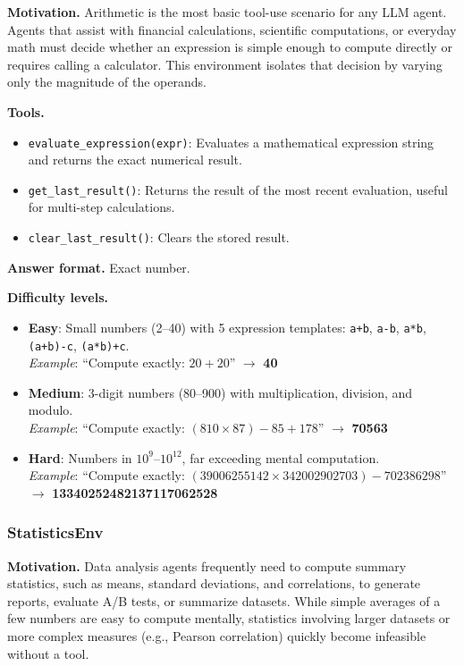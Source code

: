 \textbf{Motivation.}
Arithmetic is the most basic tool-use scenario for any LLM agent. Agents that assist with financial calculations, scientific computations, or everyday math must decide whether an expression is simple enough to compute directly or requires calling a calculator. This environment isolates that decision by varying only the magnitude of the operands.

\textbf{Tools.}
\begin{itemize}
    \item \texttt{evaluate\_expression(expr)}: Evaluates a mathematical expression string and returns the exact numerical result.
    \item \texttt{get\_last\_result()}: Returns the result of the most recent evaluation, useful for multi-step calculations.
    \item \texttt{clear\_last\_result()}: Clears the stored result.
\end{itemize}

\textbf{Answer format.} Exact number.

\textbf{Difficulty levels.}
\begin{itemize}
    \item \textbf{Easy}: Small numbers (2--40) with 5 expression templates: \texttt{a+b}, \texttt{a-b}, \texttt{a*b}, \texttt{(a+b)-c}, \texttt{(a*b)+c}.\\
    \emph{Example}: ``Compute exactly: $20 + 20$'' $\to$ \textbf{40}
    \item \textbf{Medium}: 3-digit numbers (80--900) with multiplication, division, and modulo.\\
    \emph{Example}: ``Compute exactly: $(810 \times 87) - 85 + 178$'' $\to$ \textbf{70563}
    \item \textbf{Hard}: Numbers in $10^9$--$10^{12}$, far exceeding mental computation.\\
    \emph{Example}: ``Compute exactly: $(39006255142 \times 342002902703) - 702386298$'' $\to$ \textbf{13340252482137117062528}
\end{itemize}

\subsubsection{StatisticsEnv}

\textbf{Motivation.}
Data analysis agents frequently need to compute summary statistics, such as means, standard deviations, and correlations, to generate reports, evaluate A/B tests, or summarize datasets. While simple averages of a few numbers are easy to compute mentally, statistics involving larger datasets or more complex measures (e.g., Pearson correlation) quickly become infeasible without a tool.

